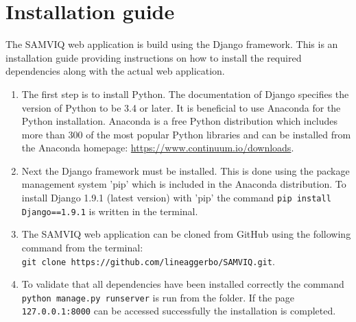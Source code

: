 \graphicspath{{Chapters/Appendices/}}

\chapter{Installation guide} %
\label{cha:installation_guide}

The SAMVIQ web application is build using the Django framework. This is an installation guide providing instructions on how to install the required dependencies along with the actual web application.

\vspace{3mm}
\begin{enumerate}[label={\textbf{Step~\arabic*:}} ,leftmargin=47pt, labelsep=4mm]
  \item The first step is to install Python. The documentation of Django specifies the version of Python to be 3.4 or later. It is beneficial to use Anaconda for the Python installation. Anaconda is a free Python distribution which includes more than 300 of the most popular Python libraries and can be installed from the Anaconda homepage: \url{https://www.continuum.io/downloads}.

  \item Next the Django framework must be installed. This is done using the package management system 'pip' which is included in the Anaconda distribution. To install Django 1.9.1 (latest version) with 'pip' the command \texttt{pip install Django==1.9.1} is written in the terminal.

  \item The SAMVIQ web application can be cloned from GitHub using the following command from the terminal:\\ \texttt{git clone https://github.com/lineaggerbo/SAMVIQ.git}.

  \item To validate that all dependencies have been installed correctly the command \texttt{python manage.py runserver} is run from the folder. If the page \texttt{127.0.0.1:8000} can be accessed successfully the installation is completed.  

\end{enumerate}
\vspace{3mm}

